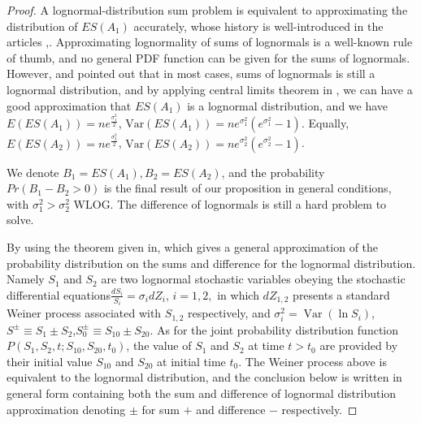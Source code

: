 \begin{appendices}
\begin{proof}
A lognormal-distribution sum problem is equivalent to approximating the distribution of $ES(A_1)$ accurately, whose history is well-introduced in the articles \cite{dufresne2008sums},\cite{vargasguzman2005change}. Approximating lognormality of sums of lognormals is a well-known rule of thumb, and no general PDF function can be given for the sums of lognormals. However, \cite{romeo2003broad} and \cite{hcine2015approximation} pointed out that in most cases, sums of lognormals is still a lognormal distribution, and by applying central limits theorem in \cite{beaulieu2011extended}, we can have a good approximation that $ES(A_1)$ is a lognormal distribution, and we have $E(ES(A_1))=ne^{\frac{\sigma_1^2}{2}}$, $\mathrm{Var}(ES(A_1))=ne^{\sigma_1^2}(e^{\sigma_1^2}-1)$. Equally, $E(ES(A_2))=ne^{\frac{\sigma_2^2}{2}}$, $\mathrm{Var}(ES(A_2))=ne^{\sigma_2^2}(e^{\sigma_2^2}-1)$.

We denote $B_1=ES(A_1),B_2=ES(A_2)$, and the probability $Pr(B_1-B_2>0)$ is the final result of our proposition in general conditions, with $\sigma_1^2>\sigma_2^2$ WLOG. The difference of lognormals is still a hard problem to solve.

By using the theorem given in\cite{lo2012sum}, which gives a general approximation of the probability distribution on the sums and difference for the lognormal distribution. Namely $S_1$ and $S_2$ are two lognormal stochastic variables obeying the stochastic differential equations$\frac{d S_{i}}{S_{i}}=\sigma_{i} d Z_{i}$, $i=1,2,$ in which $dZ_{1,2}$ presents a standard Weiner process associated with $S_{1,2}$ respectively, and $\sigma_{i}^{2}=\operatorname{Var}\left(\ln S_{i}\right)$, $S^{\pm} \equiv S_{1} \pm S_{2}$,$S_0^{\pm} \equiv S_{10} \pm S_{20}$. As for the joint probability distribution function $P\left(S_{1}, S_{2}, t ; S_{10}, S_{20}, t_{0}\right)$, the value of $S_1$ and $S_2$ at time $t>t_0$ are provided by their initial value $S_{10}$ and $S_{20}$ at initial time $t_0$. The Weiner process above is equivalent to the lognormal distribution\cite{weiner1984meaning}, and the conclusion below is written in general form containing both the sum and difference of lognormal distribution approximation denoting $\pm$ for sum $+$ and difference $-$ respectively.
 

\end{proof}
\end{appendices}
